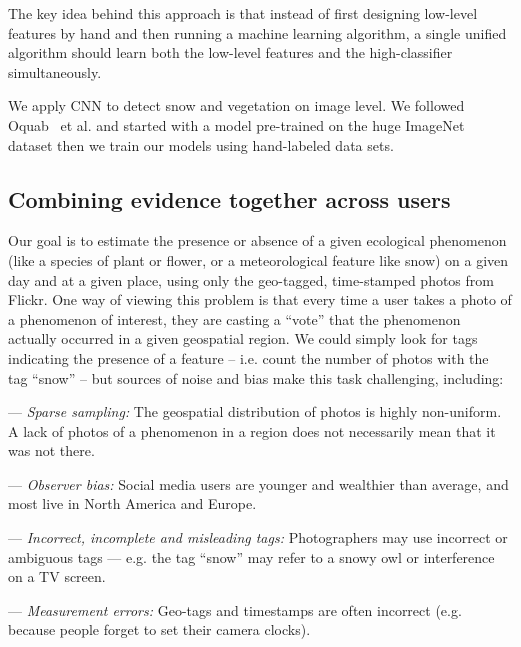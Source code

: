 \documentclass[10pt,journal,compsoc]{IEEEtran}
\begin{document}
The key idea behind this approach is that instead of first designing low-level features by
hand and then running a machine learning algorithm, a single unified
algorithm should learn both the low-level features and the
high-classifier simultaneously. 

We apply CNN to detect snow and vegetation on image level. We followed Oquab~\cite{Oquab14} et al. and started with a model pre-trained on the huge ImageNet dataset then we train our models using hand-labeled data sets.
 



\subsection{Combining evidence together across users}

Our goal is to estimate the presence or absence of a given ecological
phenomenon (like a species of plant or flower, or a meteorological
feature like snow) on a given day and at a given place,
using only the geo-tagged, time-stamped photos from Flickr. One way of viewing
this problem is that every time a user takes a photo of a phenomenon
of interest, they are casting a ``vote''  that the
phenomenon actually occurred in a given geospatial region. 
 We could
simply look for tags indicating the presence of a feature --
i.e. count the number of photos with the tag ``snow'' --  
but sources of noise and bias make this task 
challenging, including:
\begin{packed_itemize}
\item[---] \textit{Sparse sampling:} The geospatial distribution of photos
  is highly non-uniform. A lack of photos
  of a phenomenon in a region does not
  necessarily mean that it was not there. 
\item[---] \textit{Observer bias:} Social media users are younger and
  wealthier than average, and most live in North
  America and Europe.
\item[---] \textit{Incorrect, incomplete and misleading tags:}
  Photographers may use incorrect or ambiguous tags  ---
  e.g. the tag ``snow'' may refer to a snowy owl or interference on a
  TV screen.
\item[---] \textit{Measurement errors:} Geo-tags and timestamps are
  often incorrect (e.g. because people   forget to set their camera clocks).
\end{packed_itemize}
\end{document}
